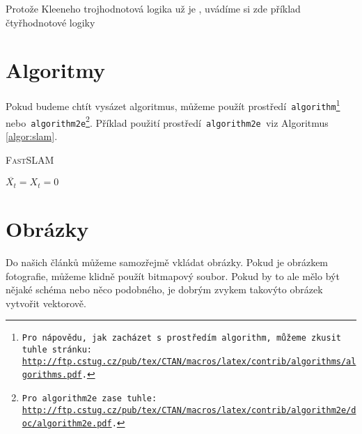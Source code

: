 \documentclass[a4paper, 11pt]{article}
\begin{document}
\begin{table}[h!]
\caption{Protože Kleeneho trojhodnotová logika už je , uvádíme si zde příklad čtyřhodnotové logiky}
\label{tab:log}

\end{table}
\bigskip

\pagebreak

\section{Algoritmy}

Pokud budeme chtít vysázet algoritmus, můžeme použít prostředí\texttt{ algorithm\footnote{Pro nápovědu, jak zacházet s prostředím\texttt{ algorithm,} můžeme zkusit tuhle stránku:\\ \url{http://ftp.cstug.cz/pub/tex/CTAN/macros/latex/contrib/algorithms/algorithms.pdf}.} }nebo\texttt{ algorithm2e\footnote{Pro\texttt{ algorithm2e }zase tuhle: \url{http://ftp.cstug.cz/pub/tex/CTAN/macros/latex/contrib/algorithm2e/doc/algorithm2e.pdf}.}}. Příklad použití prostředí\texttt{ algorithm2e }viz Algoritmus \ref{algor:slam}.

\bigskip
\begin{algorithm2e}
\caption{\textsc{FastSLAM}}
\label{algor:slam}
\LinesNumbered
{}
\SetInd{1em}{1em}
\SetNlSty{}{}{:}
\SetNlSkip{-1.2em}
\DontPrintSemicolon
{}
\Indentp{1.66em}
\BlankLine
$\overline{X_t} = X_t = 0$ \;
\end{algorithm2e}

\section{Obrázky}

Do našich článků můžeme samozřejmě vkládat obrázky. Pokud je obrázkem fotografie, můžeme klidně použít bitmapový soubor. Pokud by to ale mělo být nějaké schéma nebo něco podobného, je dobrým zvykem takovýto obrázek vytvořit vektorově.
\end{document}
